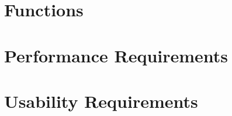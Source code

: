 \documentclass{scrreprt}
\begin{document}
\section{Functions}


\section{Performance Requirements}


\section{Usability Requirements}
\end{document}
